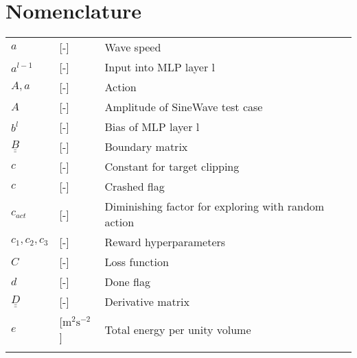 \chapter*{Nomenclature}
\begin{tabular}{lll}
    \vspace{1mm}
   $a$              & [-]             & 
Wave speed\\
   \vspace{1mm}
   $a^{l-1}$              & [-]             & Input into MLP layer l\\  
  \vspace{1mm}
      $A,a$              & [-]             & Action\\ 
    \vspace{1mm}
     $A$              & [-]             & Amplitude of SineWave test case \\
    \vspace{1mm}
     $b^l$              & [-]             & Bias of MLP layer l\\  
     $\underline{\underline{B}}$              & [-]             & Boundary matrix\\   
    \vspace{1mm}
    $c$              & [-]             & Constant for target clipping\\
      \vspace{1mm}
    $c$              & [-]             & Crashed flag\\
    \vspace{1mm}
   $c_{act}$              & [-]             & Diminishing factor for exploring with random action\\
    \vspace{1mm}
   $c_1,c_2,c_3$              & [-]             & Reward hyperparameters\\ 
    \vspace{1mm}
       $C$              & [-]             & Loss function\\          	\vspace{1mm}
       $d$              & [-]             & Done flag\\    	
       \vspace{1mm}
       $\underline{\underline{D}}$              & [-]             & Derivative matrix\\    
   \vspace{1mm} 
  $e$        & [$\text{m}^2\text{s}^{-2}$]            & Total energy per unity volume \\
  \vspace{1mm}

\end{tabular}
